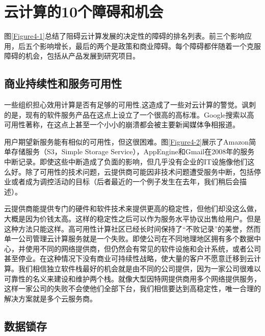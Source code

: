 
\section{云计算的10个障碍和机会}

图\ref{Figure4-1}总结了阻碍云计算发展的决定性的障碍的排名列表。前三个影响应用，后五个影响增长，最后的两个是政策和商业障碍。每个障碍都伴随着一个克服障碍的机会，包括从产品发展到研究项目。


\subsection{商业持续性和服务可用性}

一些组织担心效用计算是否有足够的可用性,这造成了一些对云计算的警觉。讽刺的是，现有的软件服务产品在这点上设立了一个很高的高标准。Google搜索以高可用性著称，在这点上甚至一个小小的崩溃都会被主要新闻媒体争相报道。

用户期望新服务能有相似的可用性，但这很困难。图\ref{Figure4-2}展示了Amazon简单存储服务（S3，Simple Storage Service），AppEngine和Gmail在2008年的服务中断记录。即使这些中断造成了负面的影响，但几乎没有企业的IT设施像他们这么好。除了可用性的技术问题，云提供商可能因非技术问题遭受服务中断，包括停业或者成为调控活动的目标（后者最近的一个例子发生在去年，我们稍后会描述）。

云提供商能提供专门的硬件和软件技术来提供更高的稳定性，但他们却没这么做，大概是因为价钱太高。这样的稳定性之后可以作为服务水平协议出售给用户。但是这种方法只能这样。高可用性计算社区已经长时间保持了“不败记录”的美誉，然而单一公司管理云计算服务就是一个失败。即使公司在不同地理地区拥有多个数据中心，并使用不同的网络提供商，但仍然会有常见的软件设施和会计系统，或者公司甚至停业。在这种情况下没有商业可持续性战略，使大量的客户不愿意迁移到云计算。我们相信独立软件栈最好的机会就是由不同的公司提供，因为一家公司很难以可靠性的名义来建设和维护两个栈。就像大型因特网提供商用多个网络提供服务，这样一家公司的失败不会使他们全部下台，我们相信要达到高稳定性，唯一合理的解决方案就是多个云服务商。


\subsection{数据锁存}

